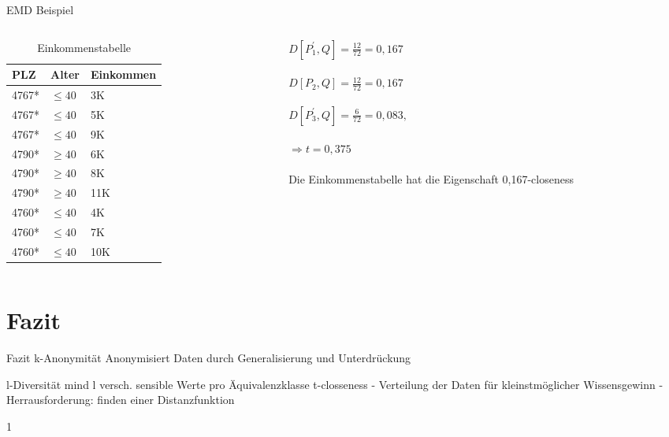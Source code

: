 \begin{frame} {EMD Beispiel}
	
	\begin{columns}[T]
		\begin{column}{0.5\textwidth}
			\begin{table}[]
				\centering
				\label{tclossenessExample}
				\begin{tabular}{|l|l|l|}
					\hline
					\textbf{PLZ}   & \textbf{Alter}    & \textbf{Einkommen} \\\hline
					4767* & $\le 40$ & 3K \\
					4767* & $\le 40$ & 5K \\
					4767* & $\le 40$ & 9K \\\hline
					4790* & $\ge 40$ & 6K \\
					4790* & $\ge 40$ & 8K \\
					4790* & $\ge 40$ & 11K \\\hline
					4760* & $\le 40$ & 4K \\
					4760* & $\le 40$ & 7K \\
					4760* & $\le 40$ & 10K \\\hline
				\end{tabular}
				\caption{Einkommenstabelle}
			\end{table}
		\end{column}
		
		\begin{column}{0.5\textwidth}
			$D[P_1^{'},Q]=\frac{12}{72} = 0,167$\\
			\ \\
			$D[P_2,Q]=\frac{12}{72} = 0,167$\\
			\ \\
			$D[P_3^{'},Q]=\frac{6}{72} = 0,083,$\\
			\ \\
			$\Rightarrow t=0,375$\\
			\ \\
			Die Einkommenstabelle hat die Eigenschaft 0,167-closeness	
		\end{column}
	\end{columns}

\end{frame}
\section{Fazit}
\begin{frame} {Fazit}
	k-Anonymität
	Anonymisiert Daten durch Generalisierung und Unterdrückung
	
	l-Diversität
	mind l versch. sensible Werte pro Äquivalenzklasse
	t-closseness
	- Verteilung  der Daten für kleinstmöglicher Wissensgewinn	
	- Herrausforderung: finden einer    	  Distanzfunktion
\end{frame}
1